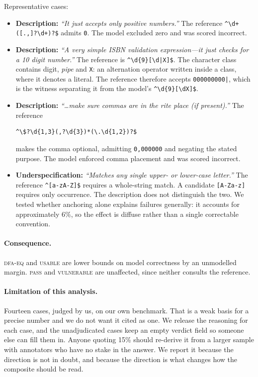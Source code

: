 \documentclass[11pt]{article}
\newcommand{\pass}{\textsc{pass}}
\newcommand{\usable}{\textsc{usable}}
\newcommand{\vuln}{\textsc{vulnerable}}
\newcommand{\dfaeq}{\textsc{dfa-eq}}
\begin{document}
Representative cases:

\begin{itemize}
\item \textbf{Description:} \emph{``It just accepts only positive numbers.''}
The reference \lstinline!^\d+([.,]?\d+)?$! admits \texttt{0}. The model
excluded zero and was scored incorrect.

\item \textbf{Description:} \emph{``A very simple ISBN validation
expression---it just checks for a 10 digit number.''} The reference is
\lstinline!^\d{9}[\d|X]$!. The character class contains digit, \emph{pipe}
and \texttt{X}: an alternation operator written inside a class, where it
denotes a literal. The reference therefore accepts \texttt{000000000|}, which
is the witness separating it from the model's \lstinline!^\d{9}[\dX]$!.

\item \textbf{Description:} \emph{``\ldots make sure commas are in the rite
place (if present).''} The reference
\begin{lstlisting}
^\$?\d{1,3}(,?\d{3})*(\.\d{1,2})?$
\end{lstlisting}
makes the comma optional, admitting \texttt{0,000000} and negating the stated
purpose. The model enforced comma placement and was scored incorrect.

\item \textbf{Underspecification:} \emph{``Matches any single upper- or
lower-case letter.''} The reference \lstinline!^[a-zA-Z]$! requires a
whole-string match. A candidate \lstinline![A-Za-z]! requires only
occurrence. The description does not distinguish the two. We tested whether anchoring alone
explains failures generally: it accounts for approximately 6\%, so the effect
is diffuse rather than a single correctable convention.
\end{itemize}

\paragraph{Consequence.} \dfaeq{} and \usable{} are lower bounds on model
correctness by an unmodelled margin. \pass{} and \vuln{} are unaffected,
since neither consults the reference.

\paragraph{Limitation of this analysis.} Fourteen cases, judged by us, on our
own benchmark. That is a weak basis for a precise number and we do not want it
cited as one. We release the reasoning for each case, and the unadjudicated
cases keep an empty verdict field so someone else can fill them in. Anyone
quoting 15\% should re-derive it from a larger sample with annotators who have
no stake in the answer. We report it because the direction is not in doubt,
and because the direction is what changes how the composite should be read.
\end{document}
